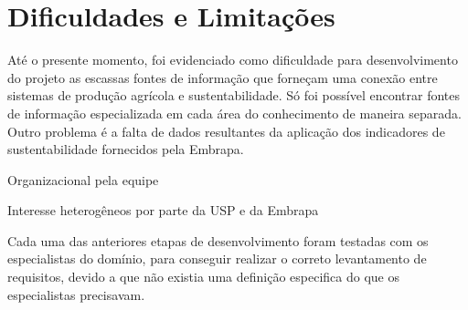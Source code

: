 \section{Dificuldades e Limitações}

Até o presente momento, foi evidenciado como dificuldade para desenvolvimento
do projeto as escassas fontes de informação que forneçam uma conexão
entre sistemas de produção agrícola e sustentabilidade. Só foi possível
encontrar fontes de informação especializada em cada área do conhecimento
de maneira separada. Outro problema é a falta de dados resultantes
da aplicação dos indicadores de sustentabilidade fornecidos pela Embrapa.

Organizacional pela equipe

Interesse heterogêneos por parte da USP e da Embrapa

Cada uma das anteriores etapas de desenvolvimento foram testadas com
os especialistas do domínio, para conseguir realizar o correto levantamento
de requisitos, devido a que não existia uma definição especifica do
que os especialistas precisavam.
